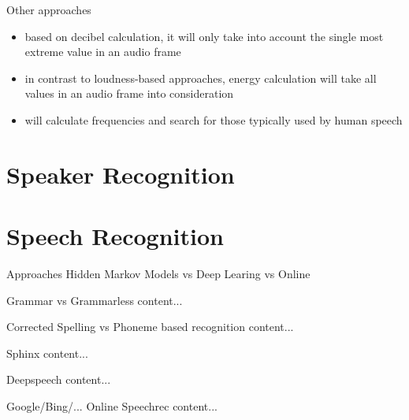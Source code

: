 \documentclass{beamer}
\begin{document}
	\begin{frame}{Other approaches} %
		\begin{itemize}
			\item[loudness-based] based on decibel calculation, it will only take into account the single most extreme value in an audio frame
			\item[energy-based] in contrast to loudness-based approaches, energy calculation will take all values in an audio frame into consideration
			\item[frequency-based] will calculate frequencies and search for those typically used by human speech
		\end{itemize}
	\end{frame}
	
	\section{Speaker Recognition}%
	
	\section{Speech Recognition}%
	
	\begin{frame}{Approaches}
		Hidden Markov Models
		vs
		Deep Learing
		vs 
		Online
	\end{frame}
	
	\begin{frame}{Grammar vs Grammarless}
		content...
	\end{frame}
	
	\begin{frame}{Corrected Spelling vs Phoneme based recognition}
		content...
	\end{frame}
	
	\begin{frame}{Sphinx}
		content...
	\end{frame}
	
	\begin{frame}{Deepspeech}
		content...
	\end{frame}
	
	\begin{frame}{Google/Bing/... Online Speechrec}
		content...
	\end{frame}
	
\end{document}
